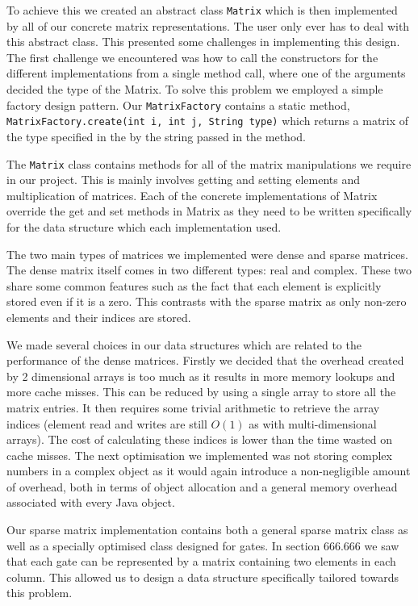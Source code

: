 \documentclass[bibliography=totocnumbered, 10pt]{article}
\theoremstyle{NoticeStyle}
\begin{document}
To achieve this we created an abstract class \texttt{Matrix} which is then implemented by all of our concrete matrix representations. The user only ever has to deal with this abstract class. This presented some challenges in implementing this design. The first challenge we encountered was how to call the constructors for the different implementations from a single method call, where one of the arguments decided the type of the Matrix. To solve this problem we employed a simple factory design pattern. Our \texttt{MatrixFactory} contains a static method, \texttt{MatrixFactory.create(int i, int j, String type)} which returns a matrix of the type specified in the by the string passed in the method.

The \texttt{Matrix} class contains methods for all of the matrix manipulations we require in our project. This is mainly involves getting and setting elements and multiplication of matrices. Each of the concrete implementations of Matrix override the get and set methods in Matrix as they need to be written specifically for the data structure which each implementation used.

The two main types of matrices we implemented were dense and sparse matrices. The dense matrix itself comes in two different types: real and complex. These two share some common features such as the fact that each element is explicitly stored even if it is a zero. This contrasts with the sparse matrix as only non-zero elements and their indices are stored.

We made several choices in our data structures which are related to the performance of the dense matrices. Firstly we decided that the overhead created by 2 dimensional arrays is too much as it results in more memory lookups and more cache misses. This can be reduced by using a single array to store all the matrix entries. It then requires some trivial arithmetic to retrieve the array indices (element read and writes are still $O(1)$ as with multi-dimensional arrays). The cost of calculating these indices is lower than the time wasted on cache misses. 
The next optimisation we implemented was not storing complex numbers in a complex object as it would again introduce a non-negligible amount of overhead, both in terms of object allocation and a general memory overhead associated with every Java object.

Our sparse matrix implementation contains both a general sparse matrix class as well as a specially optimised class designed for gates. In section 666.666 we saw that each gate can be represented by a matrix containing two elements in each column. This allowed us to design a data structure specifically tailored towards this problem.
\end{document}
